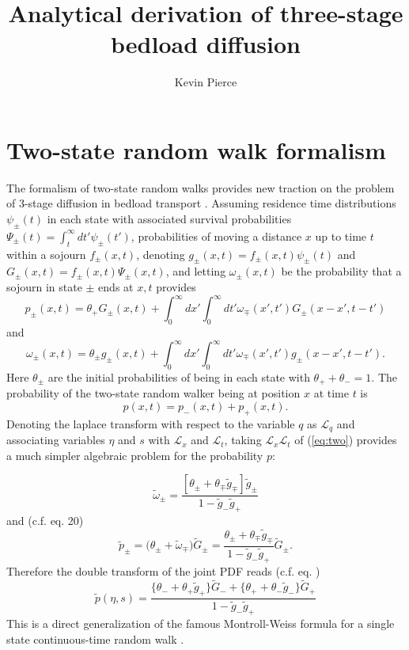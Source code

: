 \documentclass[11pt]{article}
\newcommand\be{\begin{equation}} %
\newcommand\ee{\end{equation}}   %
\newcommand\El{\mathcal{L}}
\newcommand\tg{\tilde{g}}
\newcommand\tG{\tilde{G}}
\begin{document}
\title{Analytical derivation of three-stage bedload diffusion}
\author{Kevin Pierce}
\maketitle

\section{Two-state random walk formalism}
The formalism of two-state random walks \citep[e.g.][]{Weiss1976,Weiss1994,Masoliver2016,Masoliver2017} provides new traction on the problem of 3-stage diffusion in bedload transport \citep[e.g.][]{Nikora2001a,Nikora2002,Zhang2012,Fan2016}.
Assuming residence time distributions $\psi_\pm(t)$ in each state with associated survival probabilities $\Psi_\pm(t) = \int_t^\infty dt' \psi_\pm(t')$, probabilities of moving a distance $x$ up to time $t$ within a sojourn $f_\pm(x,t)$, denoting $g_\pm(x,t) =f_\pm(x,t)\psi_\pm(t)$ and $G_\pm(x,t) = f_\pm(x,t)\Psi_\pm(x,t)$, and letting $\omega_\pm(x,t)$ be the probability that a sojourn in state $\pm$ ends at $x,t$ provides
\be  p_\pm(x,t) = \theta_+ G_\pm(x,t) + \int_0^\infty dx' \int_0^\infty dt' \omega_{\mp}(x',t')G_\pm(x-x',t-t')\ee
and 
\be \omega_\pm(x,t) = \theta_\pm g_\pm(x,t) + \int_0^\infty dx' \int_0^\infty dt' \omega_\mp(x',t')g_\pm(x-x',t-t').\label{eq:two}\ee
Here $\theta_\pm$ are the initial probabilities of being in each state with $\theta_+ + \theta_-=1.$
The probability of the two-state random walker being at position $x$ at time $t$ is 
\be p(x,t) = p_-(x,t)+p_+(x,t).\ee
Denoting the laplace transform with respect to the variable $q$ as $\El_q$ and associating variables $\eta$ and $s$ with $\El_x$ and $\El_t$, 
taking $\El_x \El_t$ of (\ref{eq:two}) provides a much simpler algebraic problem for the probability $p$:

\be
\tilde{\omega}_\pm = 
\frac{[\theta_\pm+ \theta_\mp \tilde{g}_\mp]\tilde{g}_\pm}{1-\tilde{g}_-\tilde{g}_+}
\ee
and (c.f. \citet{Masoliver2016} eq. 20)
\be
\tilde{p}_\pm = \Big( \theta_\pm + \tilde{\omega}_\mp \Big)\tilde{G}_\pm = \frac{\theta_\pm + \theta_\mp \tilde{g}_\mp}{1- \tilde{g}_-\tilde{g}_+}\tilde{G}_\pm.
\ee
Therefore the double transform of the joint PDF reads (c.f. \citet{Masoliver2016} eq. )
\be
\tilde{p}(\eta,s) = \frac{\big\{ \theta_- + \theta_+ \tg_+\big\}\tG_- + \big\{\theta_+ + \theta_-\tg_-\big\}\tG_+}{1-\tg_-\tg_+}
\label{eq:mw}\ee
This is a direct generalization of the famous Montroll-Weiss formula for a single state continuous-time random walk \citep[e.g.][]{Weiss1994}.
\end{document}
